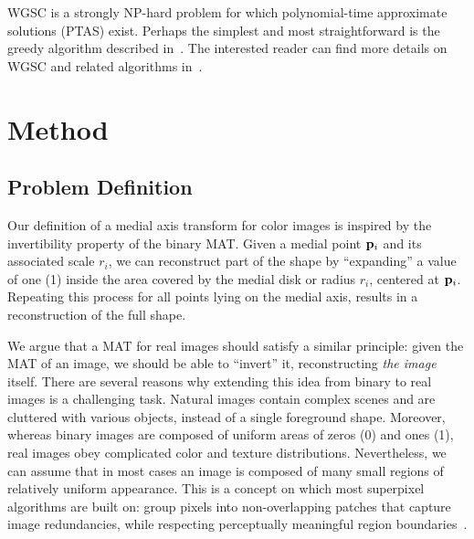 \documentclass[10pt,twocolumn,letterpaper]{article}
\begin{document}
WGSC is a strongly NP-hard problem for which polynomial-time approximate solutions (PTAS) exist.
Perhaps the simplest and most straightforward is the greedy algorithm described in~\cite{vazirani2013approximation}. 
The interested reader can find more details on WGSC and related algorithms 
in~\cite{mustafa2015quasi,varadarajan2010weighted,har2012weighted,chan2012weighted}.






\section{Method}\label{sec:method}
\subsection{Problem Definition}\label{sec:definition}
Our definition of a medial axis transform for color images is inspired by the invertibility property of the binary MAT. 
Given a medial point $\mathbf{p}_{i}$ and its associated scale $r_i$, we can reconstruct part of the shape by 
``expanding'' a value of one (1) inside the area covered by the medial disk or radius $r_i$, centered at $\mathbf{p}_{i}$.
Repeating this process for all points lying on the medial axis, results in a reconstruction of the full shape.

We argue that a MAT for real images should satisfy a similar principle: given the MAT of an image, 
we should be able to ``invert'' it, reconstructing \emph{the image} itself.
There are several reasons why extending this idea from binary to real images is a challenging task. 
Natural images contain complex scenes and are cluttered with various objects, instead of a single foreground shape. 
Moreover, whereas binary images are composed of uniform areas of zeros (0) and ones (1), 
real images obey complicated color and texture distributions. 
Nevertheless, we can assume that in most cases an image is composed of many small regions of relatively uniform appearance. 
This is a concept on which most superpixel algorithms are built on: group pixels 
into non-overlapping patches that capture image redundancies, while respecting perceptually meaningful region 
boundaries~\cite{shi2000normalized,levinshtein2009turbopixels,achanta2012slic}. 
\end{document}
